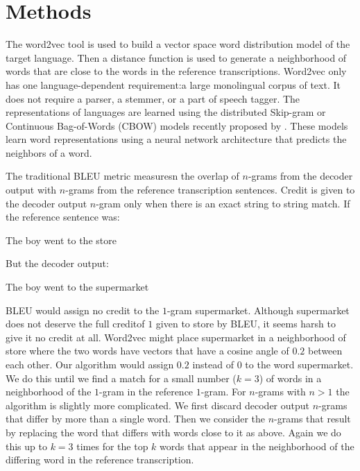 
\section{Methods}
\label{sec:methods}

The word2vec\cite{mikalov2013a} tool is used to build a vector space word distribution model of the target language. Then a distance function is used to generate a neighborhood of words that are close to the words in the reference transcriptions. Word2vec only has one language-dependent requirement:a large monolingual corpus of text. It does not require a parser, a stemmer, or a part of speech tagger.
The representations of languages are learned using the distributed Skip-gram or Continuous Bag-of-Words (CBOW) models recently proposed by \cite{mikalov2013a}. These models learn word representations using a neural network architecture that   predicts the neighbors of a word.

The traditional BLEU metric measuresn the overlap of $n$-grams from the decoder
output with $n$-grams from the reference transcription sentences.
Credit is given to the decoder output $n$-gram only when there is an exact
string to string match.
If the reference sentence was:

The boy went to the store

But the decoder output:

The boy went to the supermarket

BLEU would assign no credit to the $1$-gram supermarket.
Although supermarket does not deserve the full creditof $1$ given to store by
BLEU, it seems harsh to give it no credit at all.
Word2vec might place supermarket in a neighborhood of store where the two
words have vectors that have a cosine angle of $0.2$ between each other.
Our algorithm would assign $0.2$ instead of $0$ to the word supermarket.
We do this until we find a match for a small number ($k=3$) of words in a
neighborhood of the $1$-gram in the reference $1$-gram.
For $n$-grams with $n>1$ the algorithm is slightly more complicated.
We first discard decoder output $n$-grams that differ by more than a single
word.
Then we consider the $n$-grams that result by replacing the word that differs
with words close to it as above. Again
we do this up to $k=3$ times for the top $k$ words that appear in the
neighborhood of the differing word in the reference transcription.

